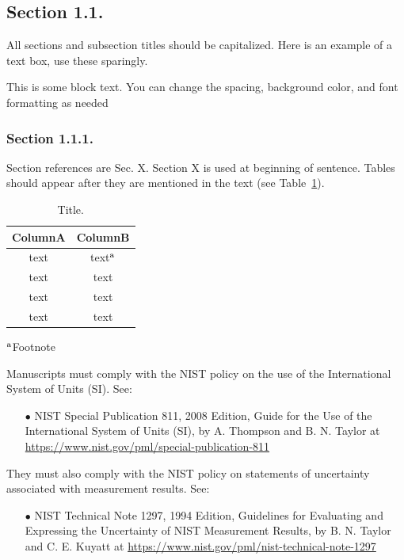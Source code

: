  \tagpdfparaOff {}
\subsection{Section 1.1.}
\tagmcend
 \tagstructend
 \label{level2:headingscap}
\tagpdfparaOn
All sections and subsection titles should be capitalized. Here is an example of a text box, use these sparingly.%

\begin{tcolorbox}%
This is some block text. You can change the spacing, background color, and font formatting as needed
\end{tcolorbox}
\tagmcend
\tagstructend

 \tagpdfparaOff {}
\subsubsection{Section 1.1.1.}
\tagmcend
 \tagstructend
\label{level3:headingscap}
\tagpdfparaOn
Section references are Sec. X. Section X is used at beginning of sentence.
Tables should appear after they are mentioned in the text (see Table~\ref{tab:example}). 

 
\begin{table}[h]
\tagpdfparaOff {}
	\centering
	\caption{Title.}
	\label{tab:example}
	\small
	\begin{tabular}{cc}
		\hline
		ColumnA & ColumnB \\ \hline
		text & text{\scriptsize $^{\rm a}$} \\
		text & text \\
		text & text \\
		text & text \\
		\hline
	\end{tabular}
	
	{\footnotesize 	{\scriptsize $^{\rm a}$}Footnote}
\tagmcend
\tagstructend
\end{table}
Manuscripts must comply with the NIST policy on the use of the International System of Units (SI). See:
\begin{itemize}
    \item[$\bullet$] NIST Special Publication 811, 2008 Edition, Guide for the Use of the International System of Units (SI), by A. Thompson and B. N. Taylor at \href{https://www.nist.gov/pml/special-publication-811}{https://www.nist.gov/pml/special-publication-811}
\end{itemize}
They must also comply with the NIST policy on statements of uncertainty associated with measurement results. See:
\begin{itemize}
    \item[$\bullet$] NIST Technical Note 1297, 1994 Edition, Guidelines for Evaluating and Expressing the Uncertainty of NIST Measurement Results, by B. N. Taylor and C. E. Kuyatt at \href{https://www.nist.gov/pml/nist-technical-note-1297}{https://www.nist.gov/pml/nist-technical-note-1297}
\end{itemize}

